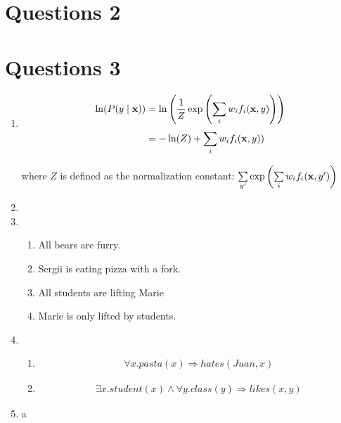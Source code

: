 \documentclass[a4paper]{article}
\begin{document}
\section*{Questions 2}

\section*{Questions 3}
\begin{enumerate}
    \item
\begin{align}
    \ln (P(y \mid\mathbf{x})) &= \ln \left(\frac{1}{Z}\exp\left(\sum\limits_{i}^{}w_if_i(\mathbf{x}, y)\right)\right)\\
    &=-\ln(Z) + \sum\limits_{i}^{}w_if_i(\mathbf{x}, y))\\
\end{align}

where $Z$ is defined as the normalization constant:
$\sum\limits_{y'}^{}\exp\left(\sum\limits_{i}^{}w_if_i(\mathbf{x}, y')\right)$

\item

\item
    \begin{enumerate}
        \item All bears are furry.
        \item Sergii is eating pizza with a fork.
        \item All students are lifting Marie
        \item Marie is only lifted by students.
    \end{enumerate}

\item
    \begin{enumerate}
        \item
            \begin{align}
                \forall x.pasta(x) \Rightarrow hates(Juan, x)
            \end{align}
        \item
            \begin{align}
                \exists x. student(x) \land \forall y.class(y) \Rightarrow likes(x, y)
            \end{align}
    \end{enumerate}

\item
    a

\end{enumerate}
\end{document}
